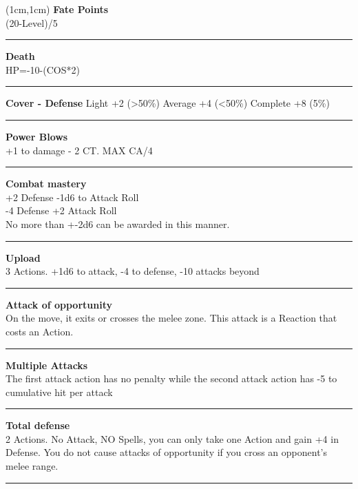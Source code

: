 \documentclass[a4paper,12 pt,openany]{book}
\newcommand{\linex}{\rule{\textwidth}{0.4pt}}
\begin{document}
\begin{textblock*}{4cm}(1cm,1cm) %
{\textbf{Fate Points}\\
(20-Level)/5}

\linex

{\textbf{Death}\\
HP=-10-(COS*2)}

\linex

\textbf{Cover - Defense}
Light +2 (>50\%)
Average +4 (<50\%)
Complete +8 (5\%)

\linex

\textbf{Power Blows}\\
+1 to damage - 2 CT. MAX CA/4

\linex

\textbf{Combat mastery}\\
+2 Defense -1d6 to Attack Roll\\
-4 Defense +2 Attack Roll \\
No more than +-2d6 can be awarded in this manner.

\linex

\textbf{Upload}\\
3 Actions. +1d6 to attack, -4 to defense, -10 attacks beyond

\linex

\textbf{Attack of opportunity}\\
On the move, it exits or crosses the melee zone. This attack is a Reaction that costs an Action.

\linex

\textbf{Multiple Attacks}\\
The first attack action has no penalty while the second attack action has -5 to cumulative hit per attack

\linex

\textbf{Total defense}\\
2 Actions. No Attack, NO Spells, you can only take one Action and gain +4 in Defense. You do not cause attacks of opportunity if you cross an opponent's melee range.

\linex


\end{textblock*}
\end{document}
